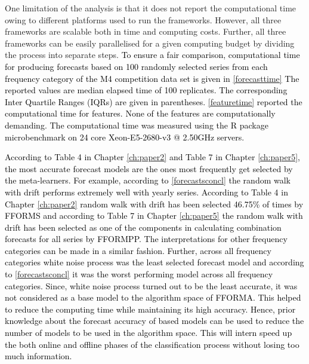 \documentclass{monashthesis}
\begin{document}
One limitation of the analysis is that it does not report the computational time owing to different platforms used to run the frameworks. However, all three frameworks are scalable both in time and computing costs. Further, all three frameworks can be easily parallelised for a given computing budget by dividing the process into separate steps. \textcolor{black}{To ensure a fair comparison, computational time for producing forecasts based on 100 randomly selected series from each frequency category of the M4 competition data set is given in} \autoref{forecasttime} \textcolor{black}{The reported values are median elapsed time of 100 replicates. The corresponding Inter Quartile Ranges (IQRs) are given in parentheses.} \autoref{featuretime} \textcolor{black}{reported the computational time for features. None of the features are computationally demanding.} \textcolor{black}{The computational time was measured using the R package microbenchmark} \autocite{microbenchmark} \textcolor{black}{on 24 core Xeon-E5-2680-v3 @ 2.50GHz servers.}

\textcolor{black}{According to Table 4 in Chapter} \ref{ch:paper2} \textcolor{black}{and Table 7 in Chapter} \ref{ch:paper5}\textcolor{black}{, the most accurate forecast models are the ones most frequently get selected by the meta-learners. For example, according to} \autoref{forecastsconcl} \textcolor{black}{the random walk with drift performs extremely well with yearly series. According to Table 4 in Chapter} \ref{ch:paper2} \textcolor{black}{random walk with drift has been selected 46.75\% of times by FFORMS and according to Table 7 in Chapter} \ref{ch:paper5} \textcolor{black}{the random walk with drift has been selected as one of the components in calculating combination forecasts for all series by FFORMPP. The interpretations for other frequency categories can be made in a similar fashion. Further, across all frequency categories white noise process was the least selected forecast model and according to } \autoref{forecastsconcl} \textcolor{black}{it was the worst performing model across all frequency categories. Since, white noise process turned out to be the least accurate, it was not considered as a base model to the algorithm space of FFORMA. This helped to reduce the computing time while maintaining its high accuracy. Hence, prior knowledge about the forecast accuracy of based models can be used to reduce the number of models to be used in the algorithm space. This will intern speed up the both online and offline phases of the classification  process without losing too much information.}
\end{document}
